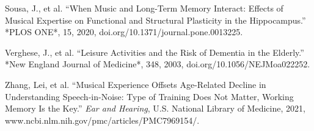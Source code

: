 \documentclass[11pt]{article}
\newcommand{\bibent}{\noindent\hangindent 20pt}
\begin{document}
\bibent
Sousa, J., et al. “When Music and Long-Term Memory Interact: Effects of Musical Expertise on Functional and Structural Plasticity in the Hippocampus.” *PLOS ONE*, 15, 2020, doi.org/10.1371/journal.pone.0013225.
\vspace{10pt}

\bibent
Verghese, J., et al. “Leisure Activities and the Risk of Dementia in the Elderly.” *New England Journal of Medicine*, 348, 2003, doi.org/10.1056/NEJMoa022252.
\vspace{10pt}

\bibent 
Zhang, Lei, et al. “Musical Experience Offsets Age-Related Decline in Understanding Speech-in-Noise: Type of Training Does Not Matter, Working Memory Is the Key.” \textit{Ear and Hearing}, U.S. National Library of Medicine, 2021, www.ncbi.nlm.nih.gov/pmc/articles/PMC7969154/.
\vspace{10pt}
 
\end{document}
